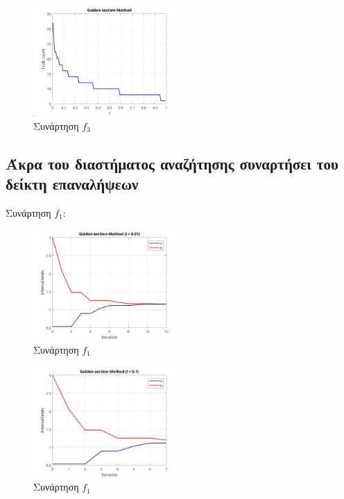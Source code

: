 \begin{figure}[H] %
    \centering
    \includegraphics[width=0.5\textwidth]{media/goldenf3} %
    \caption{Συνάρτηση $f_3$}
\end{figure}

\subsection{Άκρα του διαστήματος αναζήτησης συναρτήσει του δείκτη επαναλήψεων}
Συνάρτηση $f_1$:
\begin{figure}[H] %
    \centering
    \includegraphics[width=0.5\textwidth]{media/goldenf1_001} %
    \caption{Συνάρτηση $f_1$}
\end{figure}
\begin{figure}[H] %
    \centering
    \includegraphics[width=0.5\textwidth]{media/goldenf1_01} %
    \caption{Συνάρτηση $f_1$}
\end{figure}
